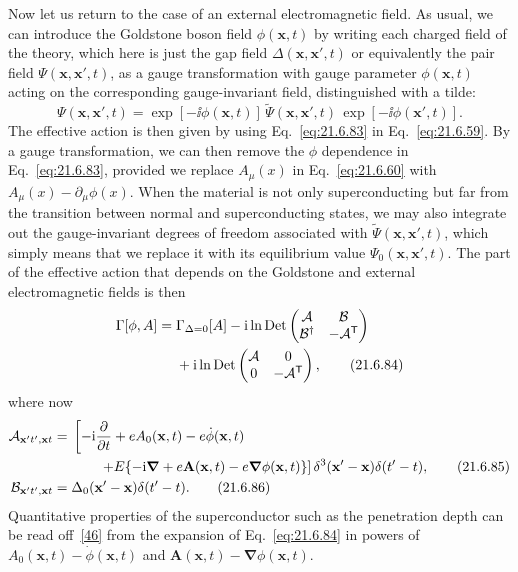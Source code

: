 Now let us return to the case of an external electromagnetic field. As usual, we can introduce the Goldstone boson field $\phi(\mathbf x,t)$ by writing each charged field of the theory, which here is just the gap field $\Delta(\mathbf x,\mathbf x',t)$ or equivalently the pair field $\Psi(\mathbf x,\mathbf x',t)$, as a gauge transformation with gauge parameter $\phi(\mathbf x,t)$ acting on the corresponding gauge-invariant field, distinguished with a tilde:
\begin{equation}
\Psi(\mathbf x,\mathbf x',t)
=\exp[-\ii\phi(\mathbf x,t)]\,
\widetilde\Psi(\mathbf x,\mathbf x',t)\,
\exp[-\ii\phi(\mathbf x',t)].
\tag{21.6.83}\label{eq:21.6.83}
\end{equation}
The effective action is then given by using Eq.~\eqref{eq:21.6.83} in Eq.~\eqref{eq:21.6.59}. By a gauge transformation, we can then remove the $\phi$ dependence in Eq.~\eqref{eq:21.6.83}, provided we replace $A_\mu(x)$ in Eq.~\eqref{eq:21.6.60} with $A_\mu(x)-\partial_\mu\phi(x)$. When the material is not only superconducting but far from the transition between normal and superconducting states, we may also integrate out the gauge-invariant degrees of freedom associated with $\widetilde\Psi(\mathbf x,\mathbf x',t)$, which simply means that we replace it with its equilibrium value $\Psi_0(\mathbf x,\mathbf x',t)$. The part of the effective action that depends on the Goldstone and external electromagnetic fields is then
\begin{align}
\Gamma[\phi,A]
={}&\Gamma_{\Delta=0}[A]
-\mathrm{i}\ln\operatorname{Det}
\begin{pmatrix}
\mathcal A&\mathcal B\\
\mathcal B^\dagger&-\mathcal A^{\mathsf T}
\end{pmatrix}
\notag\\
&+\mathrm{i}\ln\operatorname{Det}
\begin{pmatrix}
\mathcal A&0\\
0&-\mathcal A^{\mathsf T}
\end{pmatrix},
\tag{21.6.84}\label{eq:21.6.84}
\end{align}
where now
\begin{align}
\mathcal A_{\mathbf x't',\mathbf xt}
={}&\left[
-\mathrm{i}\frac{\partial}{\partial t}
+eA_0(\mathbf x,t)-e\dot\phi(\mathbf x,t)
\right.
\notag\\
&\left.\qquad
+E\{-\mathrm{i}\boldsymbol\nabla+e\mathbf A(\mathbf x,t)
-e\boldsymbol\nabla\phi(\mathbf x,t)\}
\right]
\delta^3(\mathbf x'-\mathbf x)\delta(t'-t),
\tag{21.6.85}\label{eq:21.6.85}\\
\mathcal B_{\mathbf x't',\mathbf xt}
={}&\Delta_0(\mathbf x'-\mathbf x)\delta(t'-t).
\tag{21.6.86}\label{eq:21.6.86}
\end{align}
Quantitative properties of the superconductor such as the penetration depth can be read off~\hyperref[ch21-ref-46]{[46]} from the expansion of Eq.~\eqref{eq:21.6.84} in powers of $A_0(\mathbf x,t)-\dot\phi(\mathbf x,t)$ and $\mathbf A(\mathbf x,t)-\boldsymbol\nabla\phi(\mathbf x,t)$.
